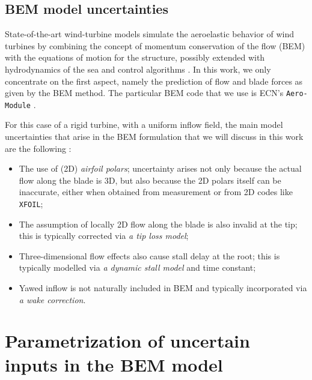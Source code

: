 \documentclass[review]{elsarticle}
\numberwithin{equation}{section}
\numberwithin{equation}{section}
\begin{document}
\subsection{BEM model uncertainties}
State-of-the-art wind-turbine models simulate the aeroelastic behavior of wind turbines by combining the concept of momentum conservation of the flow (BEM) with the equations of motion for the structure, possibly extended with hydrodynamics of the sea and control algorithms \cite{Vorpahl2013}. In this work, we only concentrate on the first aspect, namely the prediction of flow and blade forces as given by the BEM method. The particular BEM code that we use is  ECN's \texttt{Aero-Module} \cite{Boorsma2012}.

For this case of a rigid turbine, with a uniform inflow field, the main model uncertainties that arise in the BEM formulation that we will discuss in this work are the following \cite{Hansen1993}:
\begin{itemize}
\item The use of (2D) \textit{airfoil polars}; uncertainty arises not only because the actual flow along the blade is 3D, but also because the 2D polars itself can be inaccurate, either when obtained from measurement or from 2D codes like \texttt{XFOIL};
\item The assumption of locally 2D flow along the blade is also invalid at the tip; this is typically corrected via \textit{a tip loss model};
\item Three-dimensional flow effects also cause stall delay at the root; this is typically modelled via \textit{a dynamic stall model }and time constant;
\item Yawed inflow is not naturally included in BEM and typically incorporated via \textit{a wake correction}.


\end{itemize}


\section{Parametrization of uncertain inputs in the BEM model}\label{sec:parameterization}
\end{document}
